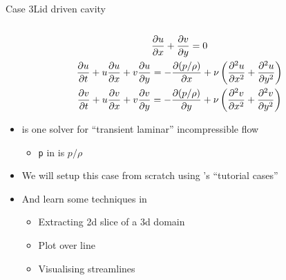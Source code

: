 \begin{frame}{Case 3}{Lid driven cavity}
\begin{columns}[T]
\begin{column}{0.7\linewidth}
            \begin{gather*}
                \pder{u}{x} + \pder{v}{y} = 0\\
                \pder{u}{t} + u \pder{u}{x} + v \pder{u}{y} = -\pder{(p/\rho)}{x} + \nu \left( \pder[2]{u}{x} + \pder[2]{u}{y} \right)\\
                \pder{v}{t} + u \pder{v}{x} + v \pder{v}{y} = -\pder{(p/\rho)}{y} + \nu \left( \pder[2]{v}{x} + \pder[2]{v}{y} \right)
            \end{gather*}
            \begin{itemize}
                \setitemsep{0.5em}
                \item \icofoam{} is one solver for ``transient laminar'' incompressible flow
                \begin{itemize}
                    \item \texttt{p} in \icofoam{} is $p/\rho$
                \end{itemize}
                \item We will setup this case from scratch using \openfoam's ``tutorial cases''
                \item And learn some techniques in \paraview
                \begin{itemize}
                    \item Extracting 2d slice of a 3d domain
                    \item Plot over line
                    \item Visualising streamlines
                \end{itemize}
            \end{itemize}
        \end{column}
    \end{columns}
\end{frame}

